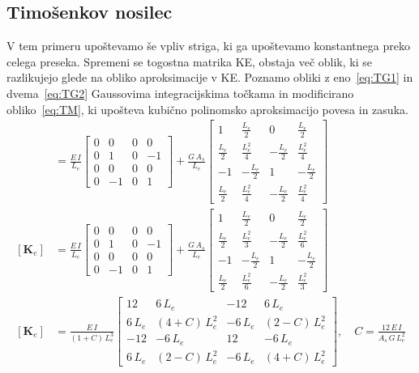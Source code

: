 \subsection{Timošenkov nosilec}
V tem primeru upoštevamo še vpliv striga, ki ga upoštevamo konstantnega preko celega preseka. Spremeni se togostna matrika KE, obstaja več oblik, ki se razlikujejo glede na obliko aproksimacije v KE. Poznamo obliki z eno~\ref{eq:TG1} in dvema~\ref{eq:TG2} Gaussovima integracijskima točkama in modificirano obliko~\ref{eq:TM}, ki upošteva kubično polinomsko aproksimacijo povesa in zasuka.
\begin{align}
    [\mathbf{K}_e] &= \frac{E\,I}{L_e}\begin{bmatrix}
        0 & 0 & 0 & 0\\
        0 & 1 & 0 & -1\\
        0 & 0 & 0 & 0\\
        0 & -1 & 0 & 1
    \end{bmatrix} + \frac{G\,A_s}{L_e}\begin{bmatrix}
        1 & \frac{L_e}{2} & 0 & \frac{L_e}{2}\\
        \frac{L_e}{2} & \frac{L_e^2}{4} & -\frac{L_e}{2} & \frac{L_e^2}{4}\\
        -1 & -\frac{L_e}{2} & 1 & -\frac{L_e}{2}\\
        \frac{L_e}{2} & \frac{L_e^2}{4} & -\frac{L_e}{2} & \frac{L_e^2}{4}
    \end{bmatrix}\label{eq:TG1}\\
    [\mathbf{K}_e] &= \frac{E\,I}{L_e}\begin{bmatrix}
        0 & 0 & 0 & 0\\
        0 & 1 & 0 & -1\\
        0 & 0 & 0 & 0\\
        0 & -1 & 0 & 1
    \end{bmatrix} + \frac{G\,A_s}{L_e}\begin{bmatrix}
        1 & \frac{L_e}{2} & 0 & \frac{L_e}{2}\\
        \frac{L_e}{2} & \frac{L_e^2}{3} & -\frac{L_e}{2} & \frac{L_e^2}{6}\\
        -1 & -\frac{L_e}{2} & 1 & -\frac{L_e}{2}\\
        \frac{L_e}{2} & \frac{L_e^2}{6} & -\frac{L_e}{2} & \frac{L_e^2}{3}
    \end{bmatrix}\label{eq:TG2}\\
    [\mathbf{K}_e] &= \frac{E\,I}{(1+C)\,L_e^3}\begin{bmatrix}
        12 & 6\,L_e & -12 & 6\,L_e\\
        6\,L_e & (4+C)\,L_e^2 & -6\,L_e & (2-C)\,L_e^2\\
        -12 & -6\,L_e & 12 & -6\,L_e\\\label{eq:TM}
        6\,L_e & (2-C)\,L_e^2 & -6\,L_e & (4+C)\,L_e^2
    \end{bmatrix}, \quad C = \frac{12\,E\,I}{A_s\,G\,L_e^2}
\end{align}


